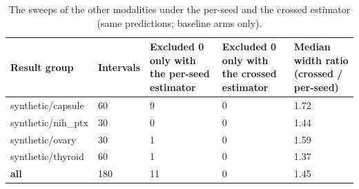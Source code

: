 \begin{table}[H]\centering\scriptsize
\caption{The sweeps of the other modalities under the per-seed and the crossed estimator (same predictions; baseline arms only).}\label{tab:estcheck}
\begin{tabular}{p{5.0cm}p{1.4cm}p{2.6cm}p{2.6cm}p{2.4cm}}\toprule
Result group & Intervals & Excluded 0 only with the per-seed estimator & Excluded 0 only with the crossed estimator & Median width ratio (crossed / per-seed) \\\midrule
synthetic/\allowbreak{}capsule & 60 & 9 & 0 & 1.72 \\
synthetic/\allowbreak{}nih\_ptx & 30 & 0 & 0 & 1.44 \\
synthetic/\allowbreak{}ovary & 30 & 1 & 0 & 1.59 \\
synthetic/\allowbreak{}thyroid & 60 & 1 & 0 & 1.37 \\
\textbf{all} & 180 & 11 & 0 & 1.45 \\
\bottomrule\end{tabular}
\end{table}
